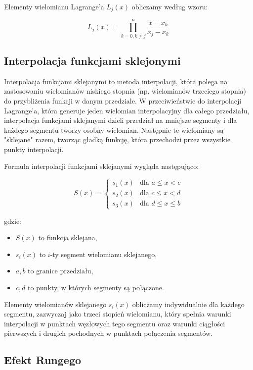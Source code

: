 \documentclass{article}
\begin{document}
Elementy wielomianu Lagrange'a \( L_j(x) \) obliczamy według wzoru:

\begin{equation}
L_j(x) = \prod_{k=0, k \neq j}^{n} \frac{x - x_k}{x_j - x_k}
\end{equation}

\subsection{Interpolacja funkcjami sklejonymi}

Interpolacja funkcjami sklejanymi to metoda interpolacji, która polega na zastosowaniu wielomianów niskiego stopnia (np. wielomianów trzeciego stopnia) do przybliżenia funkcji w danym przedziale. W przeciwieństwie do interpolacji Lagrange'a, która generuje jeden wielomian interpolacyjny dla całego przedziału, interpolacja funkcjami sklejanymi dzieli przedział na mniejsze segmenty i dla każdego segmentu tworzy osobny wielomian. Następnie te wielomiany są "sklejane" razem, tworząc gładką funkcję, która przechodzi przez wszystkie punkty interpolacji.

Formuła interpolacji funkcjami sklejanymi wygląda następująco:

\[
S(x) = 
\begin{cases} 
s_1(x) & \text{dla } a \leq x < c \\
s_2(x) & \text{dla } c \leq x < d \\
s_3(x) & \text{dla } d \leq x \leq b 
\end{cases}
\]

gdzie:
\begin{itemize}
    \item \( S(x) \) to funkcja sklejana,
    \item \( s_i(x) \) to \( i \)-ty segment wielomianu sklejanego,
    \item \( a, b \) to granice przedziału,
    \item \( c, d \) to punkty, w których segmenty są połączone.
\end{itemize}

Elementy wielomianów sklejanego \( s_i(x) \) obliczamy indywidualnie dla każdego segmentu, zazwyczaj jako trzeci stopień wielomianu, który spełnia warunki interpolacji w punktach węzłowych tego segmentu oraz warunki ciągłości pierwszych i drugich pochodnych w punktach połączenia segmentów.

\subsection{Efekt Rungego}
\end{document}
